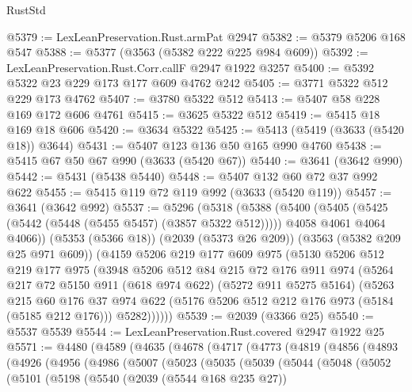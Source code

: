 \begin{lexlean}{RustStd}
\begin{coremodule}
@5379 := LexLeanPreservation.Rust.armPat @2947
@5382 := @5379 @5206 @168 @547
@5388 := @5377 (@3563 (@5382 @222 @225 @984 @609))
@5392 := LexLeanPreservation.Rust.Corr.callF @2947 @1922 @3257
@5400 := @5392 @5322 @23 @229 @173 @177 @609 @4762 @242
@5405 := @3771 @5322 @512 @229 @173 @4762
@5407 := @3780 @5322 @512
@5413 := @5407 @58 @228 @169 @172 @606 @4761
@5415 := @3625 @5322 @512
@5419 := @5415 @18 @169 @18 @606
@5420 := @3634 @5322
@5425 := @5413 (@5419 (@3633 (@5420 @18)) @3644)
@5431 := @5407 @123 @136 @50 @165 @990 @4760
@5438 := @5415 @67 @50 @67 @990 (@3633 (@5420 @67))
@5440 := @3641 (@3642 @990)
@5442 := @5431 (@5438 @5440)
@5448 := @5407 @132 @60 @72 @37 @992 @622
@5455 := @5415 @119 @72 @119 @992 (@3633 (@5420 @119))
@5457 := @3641 (@3642 @992)
@5537 := @5296
    (@5318
      (@5388
        (@5400
          (@5405 (@5425 (@5442 (@5448 (@5455 @5457) (@3857 @5322 @512)))))
          @4058
          @4061
          @4064
          @4066))
      (@5353 (@5366 @18))
      (@2039 (@5373 @26 @209))
      (@3563 (@5382 @209 @25 @971 @609))
      (@4159
        @5206
        @219
        @177
        @609
        @975
        (@5130
          @5206
          @512
          @219
          @177
          @975
          (@3948
            @5206
            @512
            @84
            @215
            @72
            @176
            @911
            @974
            (@5264
              @217
              @72
              @5150
              @911
              (@618 @974 @622)
              (@5272 @911 @5275 @5164)
              (@5263
                @215
                @60
                @176
                @37
                @974
                @622
                (@5176 @5206 @512 @212 @176 @973 (@5184 (@5185 @212 @176)))
                @5282))))))
@5539 := @2039 (@3366 @25)
@5540 := @5537 @5539
@5544 := LexLeanPreservation.Rust.covered @2947 @1922 @25
@5571 := @4480
    (@4589
      (@4635
        (@4678
          (@4717
            (@4773
              (@4819
                (@4856
                  (@4893
                    (@4926
                      (@4956
                        (@4986
                          (@5007
                            (@5023
                              (@5035
                                (@5039
                                  (@5044
                                    (@5048
                                      (@5052
                                        (@5101
                                          (@5198
                                            (@5540
                                              (@2039 (@5544 @168 @235 @27))

\end{coremodule}
\end{lexlean}
